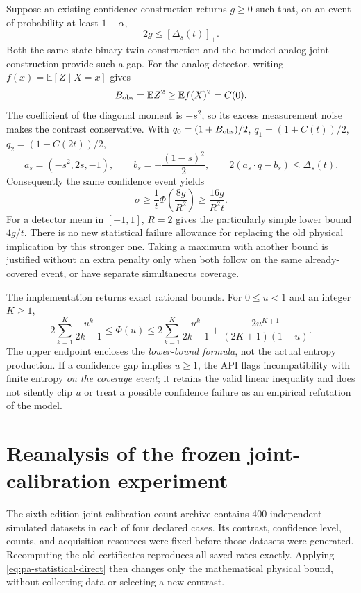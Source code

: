 Suppose an existing confidence construction returns $g\geq0$ such that,
on an event of probability at least $1-\alpha$,
\[
 2g\leq[\Delta_s(t)]_+.
\]
Both the same-state binary-twin construction and the bounded analog joint
construction provide such a gap. For the analog detector, writing
$f(x)=\mathbb E[Z\mid X=x]$ gives
\[
 B_{\rm obs}=\mathbb E Z^2\geq\mathbb E f(X)^2=C(0).
\]
The coefficient of the diagonal moment is $-s^2$, so its excess measurement
noise makes the contrast conservative. With
$q_0=(1+B_{\rm obs})/2$, $q_1=(1+C(t))/2$, $q_2=(1+C(2t))/2$,
\[
 a_s=(-s^2,2s,-1),\qquad b_s=-\frac{(1-s)^2}{2},
 \qquad 2(a_s\cdot q-b_s)\leq\Delta_s(t).
\]
Consequently the same confidence event yields
\begin{equation}
 \sigma\geq\frac{1}{t}\Phi\!\left(\frac{8g}{R^2}\right)
 \geq\frac{16g}{R^2t}.
 \label{eq:pa-statistical-direct}
\end{equation}
For a detector mean in $[-1,1]$, $R=2$ gives the particularly simple
lower bound $4g/t$. There is no new statistical failure allowance for replacing
the old physical implication by this stronger one. Taking a maximum with
another bound is justified without an extra penalty only when both follow
on the same already-covered event, or have separate simultaneous coverage.

The implementation returns exact rational bounds. For $0\leq u<1$ and
an integer $K\geq1$,
\[
 2\sum_{k=1}^K\frac{u^k}{2k-1}
 \leq\Phi(u)\leq
 2\sum_{k=1}^K\frac{u^k}{2k-1}
 +\frac{2u^{K+1}}{(2K+1)(1-u)}.
\]
The upper endpoint encloses the \emph{lower-bound formula}, not the actual
entropy production. If a confidence gap implies $u\geq1$, the API flags
incompatibility with finite entropy \emph{on the coverage event}; it retains
the valid linear inequality and does not silently clip $u$ or treat a possible
confidence failure as an empirical refutation of the model.

\section{Reanalysis of the frozen joint-calibration experiment}

The sixth-edition joint-calibration count archive contains 400 independent
simulated datasets in each of four declared cases. Its contrast, confidence
level, counts, and acquisition resources were fixed before those datasets
were generated. Recomputing the old certificates reproduces all saved rates
exactly. Applying \eqref{eq:pa-statistical-direct} then changes only the
mathematical physical bound, without collecting data or selecting a new
contrast.

